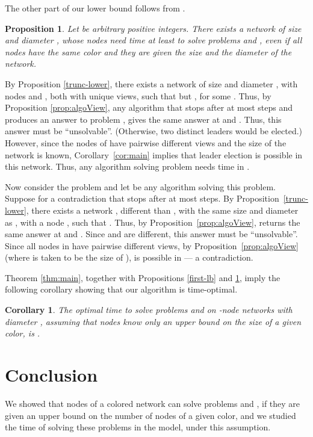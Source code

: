 \documentclass[a4paper,10pt]{article}
\newtheorem{corollary}{Corollary}[section]
\newtheorem{proposition}{Proposition}[section]
\newenvironment{proof}[1][Proof]
{\par\noindent{\bf #1:} }{\hspace*{\fill}\nolinebreak{}\bigskip\par}
\begin{document}
The other part of our lower bound follows from \cite{DKP}.
\begin{proposition}\label{second-lb}
Let  be arbitrary positive integers. There exists a network of size 
 and diameter , whose nodes need time at least  to solve problems  and , even if all nodes have the same color and they are given the size and the diameter of the 
 network.
\end{proposition}
\begin{proof}
By Proposition \ref{trunc-lower}, there exists a network  of size  and diameter , with nodes  and , both with unique views,
such that  but , for some .
Thus, by Proposition \ref{prop:algoView}, any algorithm  that stops after at most  steps and produces an answer to problem , gives the same answer at  and .
Thus, this answer must be ``unsolvable''.
(Otherwise, two distinct leaders would be elected.)
However, since the nodes of  have pairwise different views and the size of the network is known, Corollary~\ref{cor:main} implies that leader election is possible in this network.
Thus, any algorithm solving problem  needs time  in .


Now consider the problem  and let  be any algorithm solving this problem.
Suppose for a contradiction that  stops after at most  steps. 
By Proposition~\ref{trunc-lower}, there exists a network , different than , with the same size and diameter as , with a node , such that .
Thus, by Proposition~\ref{prop:algoView},  returns the same answer at  and .
Since  and  are different, this answer must be ``unsolvable''.
Since all nodes in  have pairwise different views, by Proposition~\ref{prop:algoView} (where  is {taken} to be the size of ),  is possible in  --- a contradiction.
\end{proof}

Theorem \ref{thm:main}, together with Propositions \ref{first-lb} and \ref{second-lb}, imply the following corollary showing that our algorithm is time-optimal.

\begin{corollary}
The optimal time to solve problems  and  on -node networks with diameter ,
assuming that nodes know only an upper bound  on the size of a given color, is .  
\end{corollary} 

\section{Conclusion}

We showed that nodes of a colored network can solve problems  and , if they are given an upper bound on the number of nodes of a given color, and we studied the time
of solving these problems in the   model, under this assumption. 
\end{document}
